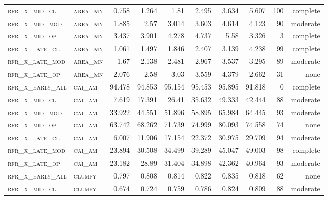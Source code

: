 \begin{landscape}
\begin{center}
\begin{footnotesize}
\begin{longtable}{llrrrrr|rrr}
\textsc{rfr\_x\_mid\_cl   } & \textsc{area\_mn  }   & 0.758   & 1.264   & 1.81     & 2.495    & 3.634    & 5.607   & 100 & complete \\
\textsc{rfr\_x\_mid\_mod  } & \textsc{area\_mn  }   & 1.885   & 2.57    & 3.014    & 3.603    & 4.614    & 4.123   & 90  & moderate \\
\textsc{rfr\_x\_mid\_op   } & \textsc{area\_mn  }   & 3.437   & 3.901   & 4.278    & 4.737    & 5.58     & 3.326   & 3   & complete \\
\textsc{rfr\_x\_late\_cl  } & \textsc{area\_mn  }   & 1.061   & 1.497   & 1.846    & 2.407    & 3.139    & 4.238   & 99  & complete \\
\textsc{rfr\_x\_late\_mod } & \textsc{area\_mn  }   & 1.67    & 2.138   & 2.481    & 2.967    & 3.537    & 3.295   & 89  & moderate \\
\textsc{rfr\_x\_late\_op  } & \textsc{area\_mn  }   & 2.076   & 2.58    & 3.03     & 3.559    & 4.379    & 2.662   & 31  & none     \\
\textsc{rfr\_x\_early\_all} & \textsc{cai\_am   }   & 94.478  & 94.853  & 95.154   & 95.453   & 95.895   & 91.818  & 0   & complete \\
\textsc{rfr\_x\_mid\_cl   } & \textsc{cai\_am   }   & 7.619   & 17.391  & 26.41    & 35.632   & 49.333   & 42.444  & 88  & moderate \\
\textsc{rfr\_x\_mid\_mod  } & \textsc{cai\_am   }   & 33.922  & 44.551  & 51.896   & 58.895   & 65.984   & 64.445  & 93  & moderate \\
\textsc{rfr\_x\_mid\_op   } & \textsc{cai\_am   }   & 63.742  & 68.262  & 71.739   & 74.999   & 80.093   & 74.558  & 74  & none     \\
\textsc{rfr\_x\_late\_cl  } & \textsc{cai\_am   }   & 6.007   & 11.906  & 17.154   & 22.372   & 30.975   & 29.709  & 94  & moderate \\
\textsc{rfr\_x\_late\_mod } & \textsc{cai\_am   }   & 23.894  & 30.508  & 34.499   & 39.289   & 45.047   & 49.003  & 98  & complete \\
\textsc{rfr\_x\_late\_op  } & \textsc{cai\_am   }   & 23.182  & 28.89   & 31.404   & 34.898   & 42.362   & 40.964  & 93  & moderate \\
\textsc{rfr\_x\_early\_all} & \textsc{clumpy    }   & 0.797   & 0.808   & 0.814    & 0.822    & 0.835    & 0.818   & 62  & none     \\
\textsc{rfr\_x\_mid\_cl   } & \textsc{clumpy    }   & 0.674   & 0.724   & 0.759    & 0.786    & 0.824    & 0.809   & 88  & moderate \\

\end{longtable}
\end{footnotesize}
\end{center}
\end{landscape}
